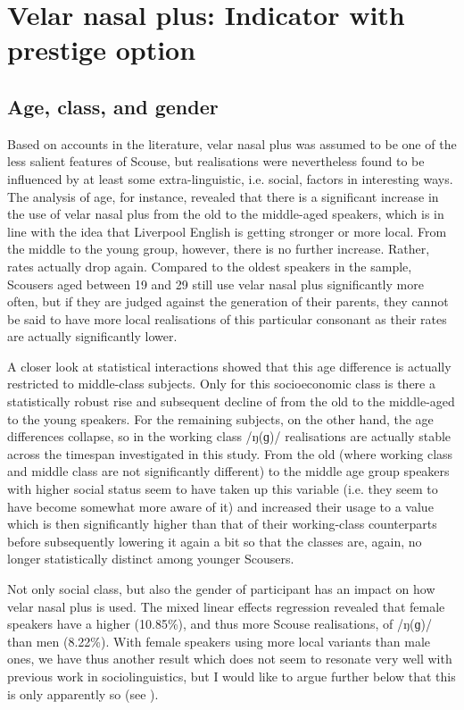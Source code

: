 \section{Velar nasal plus: Indicator with prestige option}
\label{prod.disc.ng}

\subsection{Age, class, and gender}
\label{prod.disc.ng.social}

Based on accounts in the literature, velar nasal plus was assumed to be one of the less salient features of Scouse, but realisations were nevertheless found to be influenced by at least some extra-linguistic, i.e. social, factors in interesting ways.
The analysis of age, for instance, revealed that there is a significant increase in the use of velar nasal plus from the old to the middle-aged speakers, which is in line with the idea that Liverpool English is getting stronger or more local.
From the middle to the young group, however, there is no further increase.
Rather,  rates actually drop again.
Compared to the oldest speakers in the sample, Scousers aged between 19 and 29 still use velar nasal plus significantly more often, but if they are judged against the generation of their parents, they cannot be said to have more local realisations of this particular consonant as their rates are actually significantly lower.

A closer look at statistical interactions showed that this age difference is actually restricted to middle-class subjects.
Only for this socioeconomic class is there a statistically robust rise and subsequent decline of  from the old to the middle-aged to the young speakers.
For the remaining subjects, on the other hand, the age differences collapse, so in the working class /ŋ(ɡ)/ realisations are actually stable across the timespan investigated in this study.
From the old (where working class and middle class are not significantly different) to the middle age group speakers with higher social status seem to have taken up this variable (i.e. they seem to have become somewhat more aware of it) and increased their usage to a value which is then significantly higher than that of their working-class counterparts before subsequently lowering it again a bit so that the classes are, again, no longer statistically distinct among younger Scousers.

Not only social class, but also the gender of participant has an impact on how velar nasal plus is used.
The mixed linear effects regression revealed that female speakers have a higher  (10.85\%), and thus more Scouse realisations, of /ŋ(ɡ)/ than men (8.22\%).
With female speakers using more local variants than male ones, we have thus another result which does not seem to resonate very well with previous work in sociolinguistics, but I would like to argue further below that this is only apparently so (see ).

